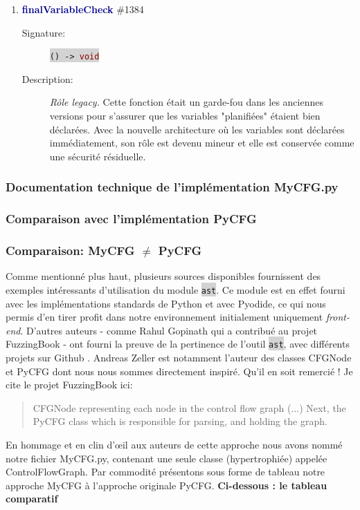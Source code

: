 \documentclass[11pt,a4paper]{article}
\let\cite\parencite
\newcommand{\code}[1]{\colorbox{lightgray}{\texttt{\small #1}}}
\newcommand{\methodname}[1]{\textbf{\textcolor{darkblue}{#1}}}
\newcommand{\rettype}[1]{\textcolor{darkred}{#1}}
\begin{document}
\begin{enumerate}
    \item \methodname{finalVariableCheck} \#1384
    \begin{description}
        \item[Signature:] \code{() -> \rettype{void}}
        \item[Description:] \textit{Rôle legacy.} Cette fonction était un garde-fou dans les anciennes versions pour s'assurer que les variables "planifiées" étaient bien déclarées. Avec la nouvelle architecture où les variables sont déclarées immédiatement, son rôle est devenu mineur et elle est conservée comme une sécurité résiduelle.
    \end{description}
    
\end{enumerate}

\subsubsection{Documentation technique de l'implémentation MyCFG.py}

\subsubsection*{Comparaison avec l'implémentation PyCFG}


\subsubsection{Comparaison: \texorpdfstring{MyCFG $\neq$ PyCFG}{MyCFG != PyCFG}}

Comme mentionné plus haut, plusieurs sources disponibles fournissent des exemples intéressants d'utilisation du module \code{ast}. Ce module est en effet fourni avec les implémentations standards de Python et avec Pyodide, ce qui nous permis d'en tirer profit dans notre environnement initialement uniquement \textit{front-end}. D'autres auteurs - comme Rahul Gopinath qui a contribué au projet FuzzingBook - ont fourni la preuve de la pertinence de l'outil \code{ast}, avec différents projets sur Github \cite{rahulgopinath}.
Andreas Zeller est notamment l'auteur des classes CFGNode et PyCFG dont nous nous sommes directement inspiré. Qu'il en soit remercié ! Je cite le projet FuzzingBook ici:
\begin{quote}
    CFGNode representing each node in the control flow graph (...) Next, the PyCFG class which is responsible for parsing, and holding the graph.
\end{quote}
En hommage et en clin d'œil aux auteurs de cette approche nous avons nommé notre fichier MyCFG.py, contenant une seule classe (hypertrophiée) appelée ControlFlowGraph. Par commodité présentons sous forme de tableau notre approche MyCFG à l'approche originale PyCFG.
\noindent\textbf{Ci-dessous : le tableau comparatif}
\end{document}
